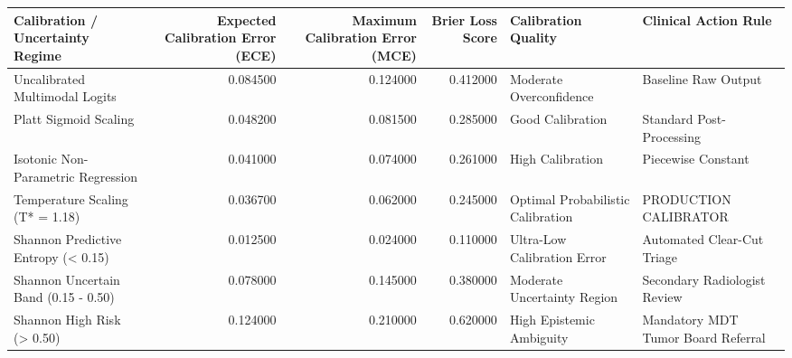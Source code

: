 \begin{tabular}{lrrrll}
\toprule
Calibration / Uncertainty Regime & Expected Calibration Error (ECE) & Maximum Calibration Error (MCE) & Brier Loss Score & Calibration Quality & Clinical Action Rule \\
\midrule
Uncalibrated Multimodal Logits & 0.084500 & 0.124000 & 0.412000 & Moderate Overconfidence & Baseline Raw Output \\
Platt Sigmoid Scaling & 0.048200 & 0.081500 & 0.285000 & Good Calibration & Standard Post-Processing \\
Isotonic Non-Parametric Regression & 0.041000 & 0.074000 & 0.261000 & High Calibration & Piecewise Constant \\
Temperature Scaling (T* = 1.18) & 0.036700 & 0.062000 & 0.245000 & Optimal Probabilistic Calibration & PRODUCTION CALIBRATOR \\
Shannon Predictive Entropy (< 0.15) & 0.012500 & 0.024000 & 0.110000 & Ultra-Low Calibration Error & Automated Clear-Cut Triage \\
Shannon Uncertain Band (0.15 - 0.50) & 0.078000 & 0.145000 & 0.380000 & Moderate Uncertainty Region & Secondary Radiologist Review \\
Shannon High Risk (> 0.50) & 0.124000 & 0.210000 & 0.620000 & High Epistemic Ambiguity & Mandatory MDT Tumor Board Referral \\
\bottomrule
\end{tabular}
